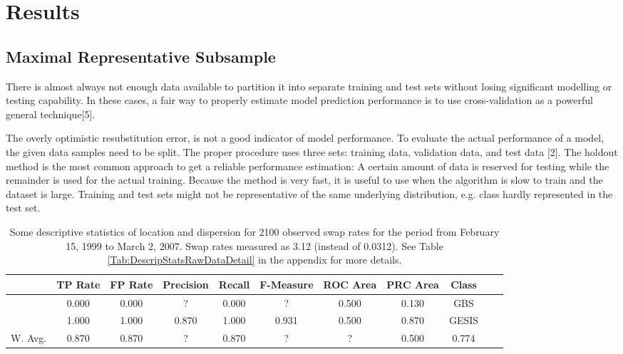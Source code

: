 \chapter{Results}\label{Sec:Results}

\section{Maximal Representative Subsample}

There is almost always not enough data available to partition it into separate training and test sets without losing signiﬁcant modelling or testing capability. In these cases, a fair way to properly estimate model prediction performance is to use cross-validation as a powerful general technique[5].

The overly optimistic resubstitution error, is not a good indicator of model performance. To evaluate the actual performance of a model, the given data samples need to be split. The proper procedure uses three sets: training data, validation data, and test data [2]. The holdout method is the most common approach to get a reliable performance estimation: A certain amount of data is reserved for testing while the remainder is used for the actual training. Because the method is very fast, it is useful to use when the algorithm is slow to train and the dataset is large. Training and test sets might not be representative of the same underlying distribution, e.g. class hardly represented in the test set.

\begin{table}[ht]
    \begin{center}
            {\footnotesize
            \begin{tabular}{l|cccccccccc}
                \hline \hline
                           &  TP Rate & FP Rate & Precision & Recall & F-Measure & ROC Area & PRC Area & Class \\
                \hline
                      & 0.000 & 0.000 & ? & 0.000 & ? & 0.500 & 0.130 & GBS &\\
                      & 1.000 & 1.000 & 0.870 & 1.000 & 0.931 & 0.500 & 0.870 & GESIS &\\
                \hline \hline
		 W. Avg. & 0.870 & 0.870 & ? & 0.870 & ? & ? & 0.500 & 0.774 &
            \end{tabular}}
        \caption{Some descriptive statistics of location and dispersion for 2100 observed swap rates for the period from February 15, 1999 to March 2, 2007. Swap rates measured as 3.12 (instead of 0.0312). See Table \ref{Tab:DescripStatsRawDataDetail} in the appendix for more details.}
\label{Tab:DescripStatsRawData}
\end{center}
\end{table}

